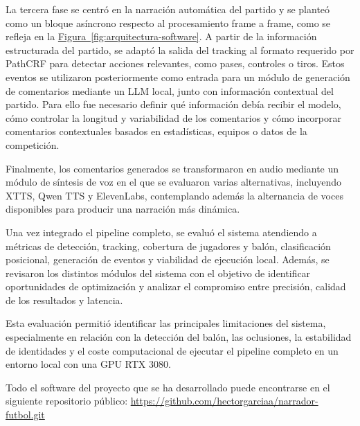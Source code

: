 La tercera fase se centró en la narración automática del partido y se planteó como un bloque asíncrono respecto al procesamiento frame a frame, como se refleja en la \hyperref[fig:arquitectura-software]{Figura~\ref*{fig:arquitectura-software}}. A partir de la información estructurada del partido, se adaptó la salida del tracking al formato requerido por PathCRF para detectar acciones relevantes, como pases, controles o tiros. Estos eventos se utilizaron posteriormente como entrada para un módulo de generación de comentarios mediante un LLM local, junto con información contextual del partido. Para ello fue necesario definir qué información debía recibir el modelo, cómo controlar la longitud y variabilidad de los comentarios y cómo incorporar comentarios contextuales basados en estadísticas, equipos o datos de la competición.

Finalmente, los comentarios generados se transformaron en audio mediante un módulo de síntesis de voz en el que se evaluaron varias alternativas, incluyendo XTTS, Qwen TTS y ElevenLabs, contemplando además la alternancia de voces disponibles para producir una narración más dinámica.

Una vez integrado el pipeline completo, se evaluó el sistema atendiendo a métricas de detección, tracking, cobertura de jugadores y balón, clasificación posicional, generación de eventos y viabilidad de ejecución local. Además, se revisaron los distintos módulos del sistema con el objetivo de identificar oportunidades de optimización y analizar el compromiso entre precisión, calidad de los resultados y latencia.

Esta evaluación permitió identificar las principales limitaciones del sistema, especialmente en relación con la detección del balón, las oclusiones, la estabilidad de identidades y el coste computacional de ejecutar el pipeline completo en un entorno local con una GPU RTX 3080.

Todo el software del proyecto que se ha desarrollado puede encontrarse en el siguiente repositorio público: \url{https://github.com/hectorgarciaa/narrador-futbol.git }


